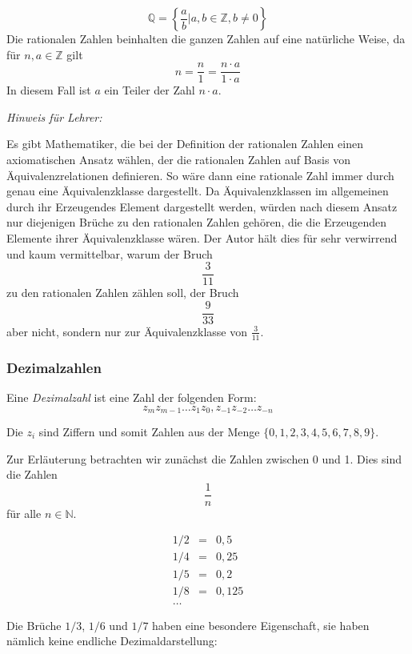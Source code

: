 \[ \mathbb{Q} = \left\{ \frac{a}{b} \vert a,b \in \mathbb{Z}, b\ne 0 \right\} \]
Die rationalen Zahlen beinhalten die ganzen Zahlen auf eine natürliche Weise, da für $n,a\in \mathbb{Z}$ gilt
\[ n = \frac{n}{1} = \frac{n \cdot a}{1\cdot a}\]
In diesem Fall ist $a$ ein Teiler der Zahl $n\cdot a$. 

\begin{svgraybox}
\textsl{Hinweis für Lehrer:}

Es gibt Mathematiker, die bei der Definition der rationalen Zahlen einen axiomatischen Ansatz wählen, der die rationalen Zahlen auf Basis von Äquivalenzrelationen definieren. So wäre dann eine rationale Zahl immer durch genau eine Äquivalenzklasse dargestellt. Da Äquivalenzklassen im allgemeinen durch ihr Erzeugendes Element dargestellt werden, würden nach diesem Ansatz nur diejenigen Brüche zu den rationalen Zahlen gehören, die die Erzeugenden Elemente ihrer Äquivalenzklasse wären. Der Autor hält dies für sehr verwirrend und kaum vermittelbar, warum der Bruch 
\[ \frac{3}{11}\]
zu den rationalen Zahlen zählen soll, der Bruch
\[ \frac{9}{33}\]
aber nicht, sondern nur zur Äquivalenzklasse von $\frac{3}{11}$.
\end{svgraybox}

\subsubsection{Dezimalzahlen}

\begin{definition}
Eine \textsl{Dezimalzahl} ist eine Zahl der folgenden Form:
\[ z_m z_{m-1} \dots z_1 z_0, z_{-1} z_{-2} \dots z_{-n} \]
\end{definition}
Die $z_i$ sind Ziffern und somit Zahlen aus der Menge $\{0,1,2,3,4,5,6,7,8,9\}$.

Zur Erläuterung betrachten wir zunächst die Zahlen zwischen 0 und 1. Dies sind die Zahlen 
\[ \frac{1}{n}\] für alle $n\in \mathbb{N}$. 

\begin{eqnarray*}
1/2 &=& 0,5 \\
1/4 &=& 0,25 \\
1/5 &=& 0,2 \\
1/8 &=& 0,125 \\
\dots
\end{eqnarray*}

Die Brüche $1/3$, $1/6$ und $1/7$ haben eine besondere Eigenschaft, sie haben nämlich keine endliche Dezimaldarstellung:

